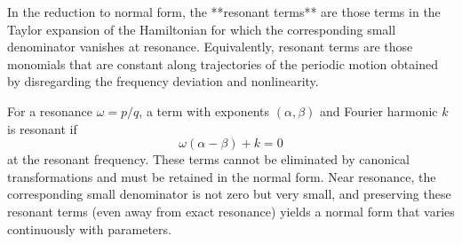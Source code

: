 In the reduction to normal form, the **resonant terms** are those terms in the Taylor expansion of the Hamiltonian for which the corresponding small denominator vanishes at resonance. Equivalently, resonant terms are those monomials that are constant along trajectories of the periodic motion obtained by disregarding the frequency deviation and nonlinearity.

For a resonance $\omega = p/q$, a term with exponents $(\alpha, \beta)$ and Fourier harmonic $k$ is resonant if
$$\omega(\alpha - \beta) + k = 0$$
at the resonant frequency. These terms cannot be eliminated by canonical transformations and must be retained in the normal form. Near resonance, the corresponding small denominator is not zero but very small, and preserving these resonant terms (even away from exact resonance) yields a normal form that varies continuously with parameters.
